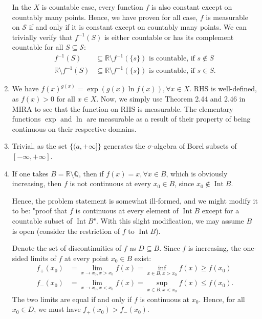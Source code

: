 \begin{enumerate}[label=\textbf{2B.\arabic*}]
  In the \( X \) is countable case, every function \( f \) is also constant
  except on countably many points. Hence, we have proven for all case, \( f \)
  is measurable on \( \mathcal{S} \) if and only if it is constant except on
  countably many points. We can trivially verify that \( f^{-1}(S) \) is either
  countable or has its complement countable for all \( S \subseteq \mathcal{S}
  \):
  \begin{align*}
    f^{-1}(S) &\subseteq \mathbb{R} \setminus f^{-1}(\{s\}  )  \text{ is
    countable, if } s \not\in S\\
    \mathbb{R} \setminus f^{-1}(S) &\subseteq \mathbb{R} \setminus f^{-1}(\{s\}  )  \text{ is countable, if } s \in S
  .\end{align*}
\item We have \( f(x)^{g(x)} = \exp (g(x) \ln f(x)), \forall  x \in X \). RHS is
  well-defined, as \( f(x) > 0 \) for all \( x \in X \). Now, we simply use
  Theorem 2.44 and 2.46 in MIRA to see that the function on RHS is measurable.
  The elementary functions \( \exp \) and \( \ln  \) are measurable as a result
  of their property of being continuous on their respective domains.
\item Trivial, as the set \( \{ (a, +\infty] \}   \) generates the \( \sigma
  \)-algebra of Borel subsets of \( [-\infty, +\infty] \).
\item 
  If one takes \( B = \mathbb{R} \setminus \mathbb{Q} \), then if \( f(x) = x,
  \forall x \in B \), which is obviously increasing, then \( f \) is not
  continuous at every \( x_{0} \in B \), since \( x_{0} \not\in
  \operatorname{Int} B \).

  Hence, the problem statement is somewhat ill-formed, and we might modify it to
  be: "proof that \( f \) is continuous at every element of \(
  \operatorname{Int} B \) except for a countable subset of \( \operatorname{Int}
  B\)". With this slight modification, we may assume \( B \) is open (consider
  the restriction of \( f \) to \( \operatorname{Int} B \)).

  Denote the set of discontinuities of \( f \) as \( D \subseteq B \).
  Since \( f \) is increasing, the one-sided limits of \( f \) at every point \(
  x_{0} \in B\) exist:
  \begin{align*}
    f_{+}(x_{0}) &= \lim_{x \to x_{0}, x > x_{0}} f(x) = \inf_{x \in B, x >
    x_{0}} f(x) \ge f(x_{0})\\
    f_{-}(x_{0}) &= \lim_{x \to x_{0}, x < x_{0}} f(x) = \sup_{x \in B, x <
    x_{0}} f(x) \le f(x_{0})
  .\end{align*}
  The two limits are equal if and only if \( f \) is continuous at \( x_{0} \).
  Hence, for all \( x_{0} \in D \), we must have \( f_{+}(x_{0}) > f_{-}(x_{0})
  \).


\end{enumerate}
